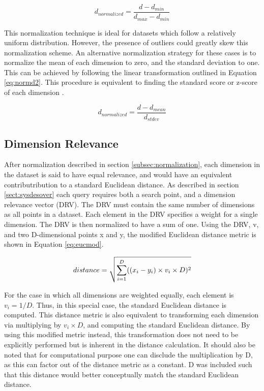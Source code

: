 \begin{equation}
\label{eq:normd}
d_{normalized} = \dfrac{d-d_{min}}{ d_{max} - d_{min} }
\end{equation}

This normalization technique is ideal for datasets which follow a relatively uniform distribution.  However, the presence of outliers could greatly skew this normalization scheme.  An alternative normalization strategy for these cases is to normalize the mean of each dimension to zero, and the standard deviation to one.  This can be achieved by following the linear transformation outlined in Equation \ref{eq:normd2}.  This procedure is equivalent to finding the standard score or z-score of each dimension \citep{cheadle2003analysis}.

\begin{equation}
\label{eq:normd2}
d_{normalized} = \dfrac{d-d_{mean}}{ d_{stdev} }
\end{equation}

\subsection{Dimension Relevance}
\label{subsec:dimrel}

After normalization described in section \ref{subsec:normalization}, each dimension in the dataset is said to have equal relevance, and would have an equivalent contributribution to a standard Euclidean distance.  As described in section \ref{sect:sysdesover} each query requires both a search point, and a dimension relevance vector (DRV).  The DRV must contain the same number of dimensions as all points in a dataset.  Each element in the DRV specifies a weight for a single dimension.  The DRV is then normalized to have a sum of one.  Using the DRV, v, and two D-dimensional points x and y, the modified Euclidean distance metric is shown in Equation \ref{eq:eucmod}.

\begin{equation}
\label{eq:eucmod}
distance = \sqrt{\sum\limits_{i=1}^D ((x_i - y_i) \times v_i \times D)^2} \\
\end{equation}

For the case in which all dimensions are weighted equally, each element is $v_i=1/D$.  Thus, in this special case, the standard Euclidean distance is computed.  This distance metric is also equivalent to transforming each dimension via multiplying by $v_i \times D$, and computing the standard Euclidean distance.  By using this modified metric instead, this transformation does not need to be explicitly performed but is inherent in the distance calculation.  It should also be noted that for computational purpose one can disclude the multiplication by D, as this can factor out of the distance metric as a constant.  D was included such that this distance would better conceptually match the standard Euclidean distance.

